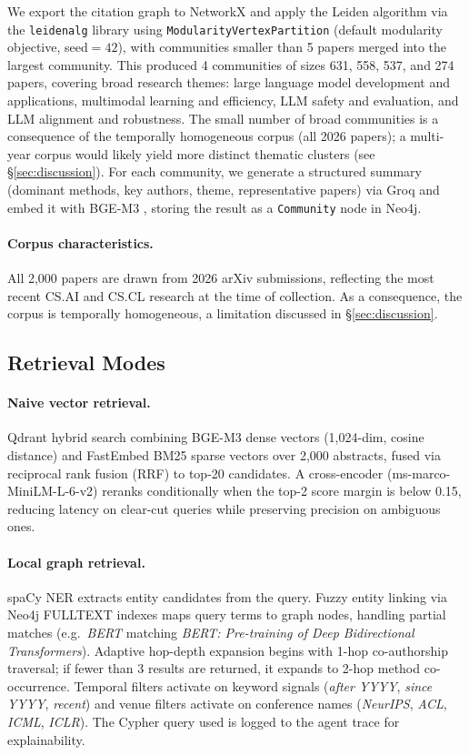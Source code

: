 \documentclass[11pt]{article}
\begin{document}
We export the citation graph to NetworkX and apply the Leiden algorithm
\cite{traag2019louvain} via the \texttt{leidenalg} library using
\texttt{ModularityVertexPartition} (default modularity objective,
seed$=42$), with communities smaller than 5 papers merged into the
largest community. This produced 4 communities of sizes 631, 558, 537,
and 274 papers, covering broad research themes: large language model
development and applications, multimodal learning and efficiency, LLM
safety and evaluation, and LLM alignment and robustness. The small number
of broad communities is a consequence of the temporally homogeneous
corpus (all 2026 papers); a multi-year corpus would likely yield more
distinct thematic clusters (see \S\ref{sec:discussion}). For each
community, we generate a structured summary (dominant methods, key
authors, theme, representative papers) via Groq and embed it with BGE-M3
\cite{chen2024bge}, storing the result as a \texttt{Community} node in
Neo4j.

\paragraph{Corpus characteristics.}
All 2,000 papers are drawn from 2026 arXiv submissions, reflecting the
most recent CS.AI and CS.CL research at the time of collection. As a
consequence, the corpus is temporally homogeneous, a limitation discussed
in \S\ref{sec:discussion}.

\subsection{Retrieval Modes}
\label{subsec:retrieval}

\paragraph{Naive vector retrieval.}
Qdrant hybrid search combining BGE-M3 dense vectors (1,024-dim, cosine
distance) and FastEmbed BM25 sparse vectors over 2,000 abstracts, fused
via reciprocal rank fusion (RRF) to top-20 candidates. A cross-encoder
(ms-marco-MiniLM-L-6-v2) reranks conditionally when the top-2 score
margin is below 0.15, reducing latency on clear-cut queries while
preserving precision on ambiguous ones.

\paragraph{Local graph retrieval.}
spaCy NER extracts entity candidates from the query. Fuzzy entity linking
via Neo4j FULLTEXT indexes maps query terms to graph nodes, handling
partial matches (e.g.\ \textit{BERT} matching \textit{BERT: Pre-training
of Deep Bidirectional Transformers}). Adaptive hop-depth expansion begins
with 1-hop co-authorship traversal; if fewer than 3 results are returned,
it expands to 2-hop method co-occurrence. Temporal filters activate on
keyword signals (\textit{after YYYY}, \textit{since YYYY},
\textit{recent}) and venue filters activate on conference names
(\textit{NeurIPS}, \textit{ACL}, \textit{ICML}, \textit{ICLR}).
The Cypher query used is logged to the agent trace for explainability.
\end{document}
